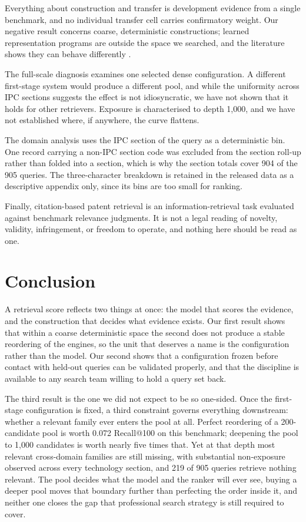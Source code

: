 \documentclass[preprint,11pt,authoryear]{elsarticle}          %
\begin{document}
Everything about construction and transfer is development evidence from a single benchmark, and no individual transfer cell carries confirmatory weight. Our negative result concerns coarse, deterministic constructions; learned representation programs are outside the space we searched, and the literature shows they can behave differently \citep{onuallain2026autoindex}.

The full-scale diagnosis examines one selected dense configuration. A different first-stage system would produce a different pool, and while the uniformity across IPC sections suggests the effect is not idiosyncratic, we have not shown that it holds for other retrievers. Exposure is characterised to depth 1{,}000, and we have not established where, if anywhere, the curve flattens.

The domain analysis uses the IPC section of the query as a deterministic bin. One record carrying a non-IPC section code was excluded from the section roll-up rather than folded into a section, which is why the section totals cover 904 of the 905 queries. The three-character breakdown is retained in the released data as a descriptive appendix only, since its bins are too small for ranking.

Finally, citation-based patent retrieval is an information-retrieval task evaluated against benchmark relevance judgments. It is not a legal reading of novelty, validity, infringement, or freedom to operate, and nothing here should be read as one.

\section{Conclusion}

A retrieval score reflects two things at once: the model that scores the evidence, and the construction that decides what evidence exists. Our first result shows that within a coarse deterministic space the second does not produce a stable reordering of the engines, so the unit that deserves a name is the configuration rather than the model. Our second shows that a configuration frozen before contact with held-out queries can be validated properly, and that the discipline is available to any search team willing to hold a query set back.

The third result is the one we did not expect to be so one-sided. Once the first-stage configuration is fixed, a third constraint governs everything downstream: whether a relevant family ever enters the pool at all. Perfect reordering of a 200-candidate pool is worth 0.072 Recall@100 on this benchmark; deepening the pool to 1{,}000 candidates is worth nearly five times that. Yet at that depth most relevant cross-domain families are still missing, with substantial non-exposure observed across every technology section, and 219 of 905 queries retrieve nothing relevant. The pool decides what the model and the ranker will ever see, buying a deeper pool moves that boundary further than perfecting the order inside it, and neither one closes the gap that professional search strategy is still required to cover.
\end{document}
